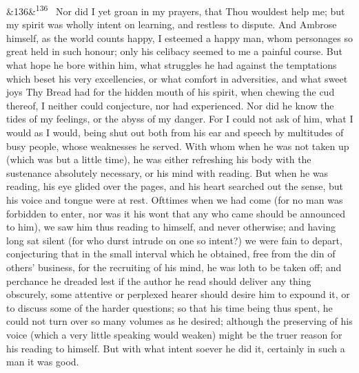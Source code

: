 \documentclass[12pt]{article}
\newcommand{\para}[1][]{\par\noindent\ifx&#1&\else\textsuperscript{\footnotesize #1}~\fi}
\begin{document}
\para[136] Nor did I yet groan in my prayers, that Thou wouldest help me; but my spirit was wholly intent on learning, and restless to dispute. And Ambrose himself, as the world counts happy, I esteemed a happy man, whom personages so great held in such honour; only his celibacy seemed to me a painful course. But what hope he bore within him, what struggles he had against the temptations which beset his very excellencies, or what comfort in adversities, and what sweet joys Thy Bread had for the hidden mouth of his spirit, when chewing the cud thereof, I neither could conjecture, nor had experienced. Nor did he know the tides of my feelings, or the abyss of my danger. For I could not ask of him, what I would as I would, being shut out both from his ear and speech by multitudes of busy people, whose weaknesses he served. With whom when he was not taken up (which was but a little time), he was either refreshing his body with the sustenance absolutely necessary, or his mind with reading. But when he was reading, his eye glided over the pages, and his heart searched out the sense, but his voice and tongue were at rest. Ofttimes when we had come (for no man was forbidden to enter, nor was it his wont that any who came should be announced to him), we saw him thus reading to himself, and never otherwise; and having long sat silent (for who durst intrude on one so intent?) we were fain to depart, conjecturing that in the small interval which he obtained, free from the din of others' business, for the recruiting of his mind, he was loth to be taken off; and perchance he dreaded lest if the author he read should deliver any thing obscurely, some attentive or perplexed hearer should desire him to expound it, or to discuss some of the harder questions; so that his time being thus spent, he could not turn over so many volumes as he desired; although the preserving of his voice (which a very little speaking would weaken) might be the truer reason for his reading to himself. But with what intent soever he did it, certainly in such a man it was good.
\end{document}
